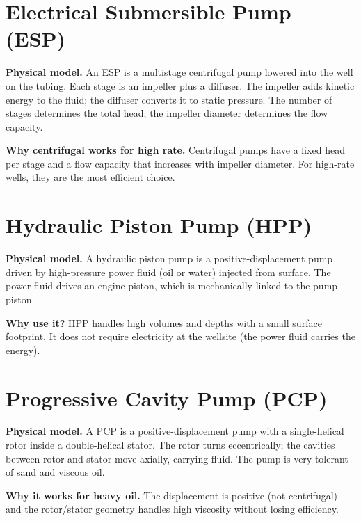 \documentclass[11pt,a4paper,openany]{book}
\begin{document}
\section{Electrical Submersible Pump (ESP)}

\begin{theory}
\textbf{Physical model.} An ESP is a multistage centrifugal pump
lowered into the well on the tubing. Each stage is an impeller plus a
diffuser. The impeller adds kinetic energy to the fluid; the diffuser
converts it to static pressure. The number of stages determines the
total head; the impeller diameter determines the flow capacity.

\textbf{Why centrifugal works for high rate.} Centrifugal pumps have
a fixed head per stage and a flow capacity that increases with
impeller diameter. For high-rate wells, they are the most efficient
choice.
\end{theory}

\section{Hydraulic Piston Pump (HPP)}

\begin{theory}
\textbf{Physical model.} A hydraulic piston pump is a positive-displacement
pump driven by high-pressure power fluid (oil or water) injected from
surface. The power fluid drives an engine piston, which is
mechanically linked to the pump piston.

\textbf{Why use it?} HPP handles high volumes and depths with a small
surface footprint. It does not require electricity at the wellsite
(the power fluid carries the energy).
\end{theory}

\section{Progressive Cavity Pump (PCP)}

\begin{theory}
\textbf{Physical model.} A PCP is a positive-displacement pump with a
single-helical rotor inside a double-helical stator. The rotor turns
eccentrically; the cavities between rotor and stator move axially,
carrying fluid. The pump is very tolerant of sand and viscous oil.

\textbf{Why it works for heavy oil.} The displacement is positive
(not centrifugal) and the rotor/stator geometry handles high
viscosity without losing efficiency.
\end{theory}
\end{document}
